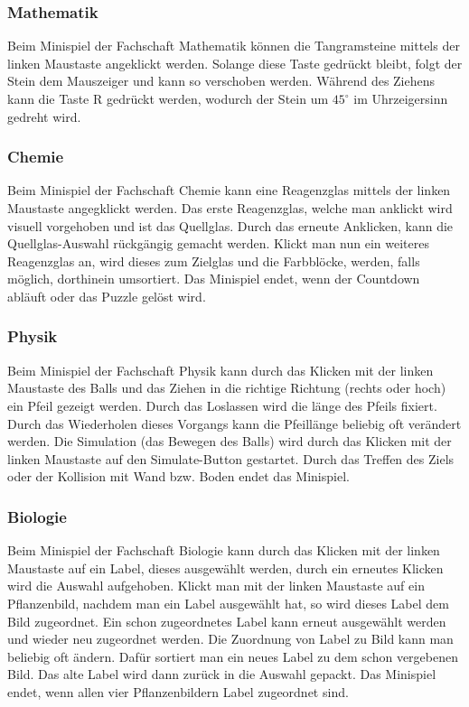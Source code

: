 \subsubsection{Mathematik}

Beim Minispiel der Fachschaft Mathematik können die Tangramsteine mittels der linken Maustaste angeklickt werden.
Solange diese Taste gedrückt bleibt, folgt der Stein dem Mauszeiger und kann so verschoben werden.
Während des Ziehens kann die Taste \glqq R \grqq{} gedrückt werden, wodurch der Stein um $45^\circ$ im Uhrzeigersinn gedreht wird.

\subsubsection{Chemie}

Beim Minispiel der Fachschaft Chemie kann eine Reagenzglas mittels der linken Maustaste angegklickt werden. Das erste Reagenzglas, welche man anklickt wird visuell vorgehoben und ist das Quellglas.
Durch das erneute Anklicken, kann die Quellglas-Auswahl rückgängig gemacht werden.
Klickt man nun ein weiteres Reagenzglas an, wird dieses zum Zielglas und die Farbblöcke, werden, falls möglich, dorthinein umsortiert.
Das Minispiel endet, wenn der Countdown abläuft oder das Puzzle gelöst wird.

\subsubsection{Physik}

Beim Minispiel der Fachschaft Physik kann durch das Klicken mit der linken Maustaste des Balls und das Ziehen in die richtige Richtung (rechts oder hoch) ein Pfeil gezeigt werden.
Durch das Loslassen wird die länge des Pfeils fixiert. Durch das Wiederholen dieses Vorgangs kann die Pfeillänge beliebig oft verändert werden.
Die Simulation (das Bewegen des Balls) wird durch das Klicken mit der linken Maustaste auf den Simulate-Button gestartet.
Durch das Treffen des Ziels oder der Kollision mit Wand bzw. Boden endet das Minispiel.

\subsubsection{Biologie}
Beim Minispiel der Fachschaft Biologie kann durch das Klicken mit der linken Maustaste auf ein Label, dieses ausgewählt werden, durch ein erneutes Klicken wird die Auswahl aufgehoben.
Klickt man mit der linken Maustaste auf ein Pflanzenbild, nachdem man ein Label ausgewählt hat, so wird dieses Label dem Bild zugeordnet. Ein schon zugeordnetes Label kann erneut ausgewählt werden und wieder neu zugeordnet werden.
Die Zuordnung von Label zu Bild kann man beliebig oft ändern. Dafür sortiert man ein neues Label zu dem schon vergebenen Bild. Das alte Label wird dann zurück in die Auswahl gepackt.
Das Minispiel endet, wenn allen vier Pflanzenbildern Label zugeordnet sind.

